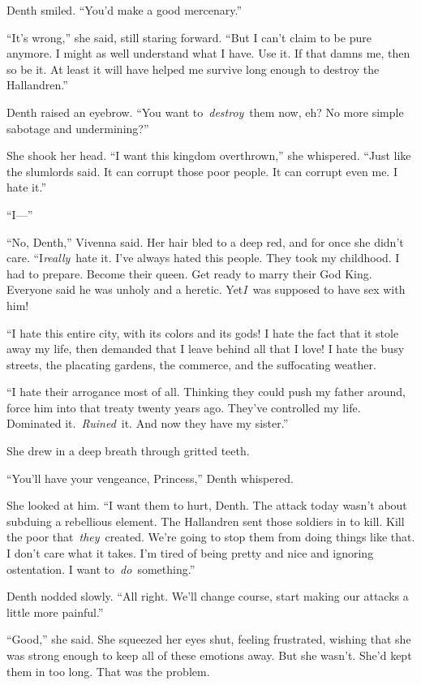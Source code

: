 Denth smiled. “You’d make a good mercenary.”

“It’s wrong,” she said, still staring forward. “But I can’t claim to be pure anymore. I might as well understand what I have. Use it. If that damns me, then so be it. At least it will have helped me survive long enough to destroy the Hallandren.”

Denth raised an eyebrow. “You want to~\textit{destroy}~them now, eh? No more simple sabotage and undermining?”

She shook her head. “I want this kingdom overthrown,” she whispered. “Just like the slumlords said. It can corrupt those poor people. It can corrupt even me. I hate it.”

“I—”

“No, Denth,” Vivenna said. Her hair bled to a deep red, and for once she didn’t care. “I\textit{really}~hate it. I’ve always hated this people. They took my childhood. I had to prepare. Become their queen. Get ready to marry their God King. Everyone said he was unholy and a heretic. Yet\textit{I}~was supposed to have sex with him!

“I hate this entire city, with its colors and its gods! I hate the fact that it stole away my life, then demanded that I leave behind all that I love! I hate the busy streets, the placating gardens, the commerce, and the suffocating weather.

“I hate their arrogance most of all. Thinking they could push my father around, force him into that treaty twenty years ago. They’ve controlled my life. Dominated it.~\textit{Ruined}~it. And now they have my sister.”

She drew in a deep breath through gritted teeth.

“You’ll have your vengeance, Princess,” Denth whispered.

She looked at him. “I want them to hurt, Denth. The attack today wasn’t about subduing a rebellious element. The Hallandren sent those soldiers in to kill. Kill the poor that~\textit{they}~created. We’re going to stop them from doing things like that. I don’t care what it takes. I’m tired of being pretty and nice and ignoring ostentation. I want to~\textit{do}~something.”

Denth nodded slowly. “All right. We’ll change course, start making our attacks a little more painful.”

“Good,” she said. She squeezed her eyes shut, feeling frustrated, wishing that she was strong enough to keep all of these emotions away. But she wasn’t. She’d kept them in too long. That was the problem.

